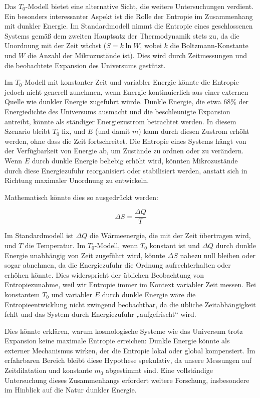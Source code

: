 \documentclass{article}
\begin{document}
	Das \( T_0 \)-Modell bietet eine alternative Sicht, die weitere Untersuchungen verdient. Ein besonders interessanter Aspekt ist die Rolle der Entropie im Zusammenhang mit dunkler Energie. Im Standardmodell nimmt die Entropie eines geschlossenen Systems gemäß dem zweiten Hauptsatz der Thermodynamik stets zu, da die Unordnung mit der Zeit wächst (\( S = k \ln W \), wobei \( k \) die Boltzmann-Konstante und \( W \) die Anzahl der Mikrozustände ist). Dies wird durch Zeitmessungen und die beobachtete Expansion des Universums gestützt.
	
	Im \( T_0 \)-Modell mit konstanter Zeit und variabler Energie könnte die Entropie jedoch nicht generell zunehmen, wenn Energie kontinuierlich aus einer externen Quelle wie dunkler Energie zugeführt würde. Dunkle Energie, die etwa 68\% der Energiedichte des Universums ausmacht und die beschleunigte Expansion antreibt, könnte als ständiger Energiezustrom betrachtet werden. In diesem Szenario bleibt \( T_0 \) fix, und \( E \) (und damit \( m \)) kann durch diesen Zustrom erhöht werden, ohne dass die Zeit fortschreitet. Die Entropie eines Systems hängt von der Verfügbarkeit von Energie ab, um Zustände zu ordnen oder zu verändern. Wenn \( E \) durch dunkle Energie beliebig erhöht wird, könnten Mikrozustände durch diese Energiezufuhr reorganisiert oder stabilisiert werden, anstatt sich in Richtung maximaler Unordnung zu entwickeln.
	
	Mathematisch könnte dies so ausgedrückt werden:
	
	\[
	\Delta S = \frac{\Delta Q}{T}
	\]
	
	Im Standardmodell ist \( \Delta Q \) die Wärmeenergie, die mit der Zeit übertragen wird, und \( T \) die Temperatur. Im \( T_0 \)-Modell, wenn \( T_0 \) konstant ist und \( \Delta Q \) durch dunkle Energie unabhängig von Zeit zugeführt wird, könnte \( \Delta S \) nahezu null bleiben oder sogar abnehmen, da die Energiezufuhr die Ordnung aufrechterhalten oder erhöhen könnte. Dies widerspricht der üblichen Beobachtung von Entropiezunahme, weil wir Entropie immer im Kontext variabler Zeit messen. Bei konstantem \( T_0 \) und variabler \( E \) durch dunkle Energie wäre die Entropieentwicklung nicht zwingend beobachtbar, da die übliche Zeitabhängigkeit fehlt und das System durch Energiezufuhr „aufgefrischt“ wird.
	
	Dies könnte erklären, warum kosmologische Systeme wie das Universum trotz Expansion keine maximale Entropie erreichen: Dunkle Energie könnte als externer Mechanismus wirken, der die Entropie lokal oder global kompensiert. Im erfahrbaren Bereich bleibt diese Hypothese spekulativ, da unsere Messungen auf Zeitdilatation und konstante \( m_0 \) abgestimmt sind. Eine vollständige Untersuchung dieses Zusammenhangs erfordert weitere Forschung, insbesondere im Hinblick auf die Natur dunkler Energie.
	
\end{document}
